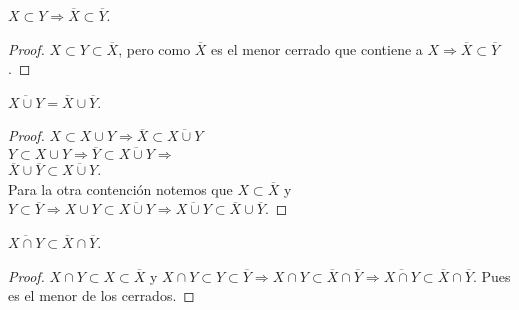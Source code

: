 \begin{prop}
  $X \subset Y \Rightarrow \overline{X} \subset \overline{Y}$.
  \begin{proof}
    $X \subset Y \subset \overline{X}$, pero como $\overline{X}$ es el menor cerrado que contiene a $X \Rightarrow \overline{X} \subset \overline{Y}$.
  \end{proof}
\end{prop}

\begin{prop}
  $\overline{X \cup Y} = \overline{X} \cup \overline{Y}$.
  \begin{proof}
    $X \subset X \cup Y \Rightarrow \overline{X} \subset \overline{X \cup Y}$ \\
    $Y \subset X \cup Y \Rightarrow \overline{Y} \subset \overline{X \cup Y} \Rightarrow$ \\
    $\overline{X} \cup \overline{Y} \subset \overline{X \cup Y}$. \\
    Para la otra contención notemos que $X \subset \overline{X}$ y $Y \subset \overline{Y} \Rightarrow X \cup Y \subset \overline{X \cup Y} \Rightarrow \overline{X \cup Y} \subset \overline{X} \cup \overline{Y}$.
  \end{proof}
\end{prop}

\begin{prop}
  $\overline{X \cap Y} \subset \overline{X} \cap \overline{Y}$.
  \begin{proof}
    $X \cap Y \subset X \subset \overline{X}$ y $X \cap Y \subset Y \subset \overline{Y} \Rightarrow X \cap Y \subset \overline{X} \cap \overline{Y} \Rightarrow \overline{X \cap Y} \subset \overline{X} \cap \overline{Y}$. Pues es el menor de los cerrados.
  \end{proof}
\end{prop}
